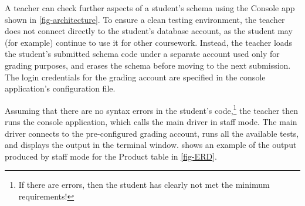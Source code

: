 \documentclass[sigconf, authordraft, capitalise]{acmart}
\begin{document}
A teacher can check further aspects of a student's schema using the \textsf{Console app} shown in \cref{fig-architecture}. To ensure a clean testing environment, the teacher does not connect directly to the student's database account, as the student may (for example) continue to use it for other coursework. Instead, the teacher loads the student's submitted schema code under a separate account used only for grading purposes, and erases the schema before moving to the next submission. The login credentials for the grading account are specified in the console application's configuration file.

Assuming that there are no syntax errors in the student's code,\footnote{If there are errors, then the student has clearly not met the minimum requirements!} the teacher then runs the console application, which calls the main driver in staff mode. The main driver connects to the pre-configured grading account, runs all the available tests, and displays the output in the terminal window.  shows an example of the output produced by staff mode for the \textsf{Product} table in \cref{fig-ERD}.




\newlength{\dothskip}
\setlength{\dothskip}{0.72cm}
\newlength{\dotvskip}
\setlength{\dotvskip}{-1.25ex}
\newlength{\codeskip}
\setlength{\codeskip}{-0.5ex}
\end{document}
